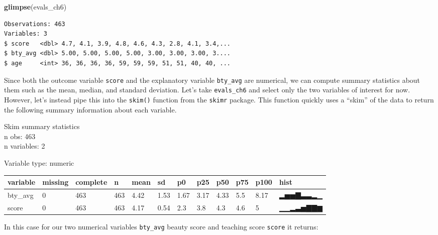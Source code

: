 \documentclass[12pt, krantz2,]{krantz}
\makeatletter
\newenvironment{Shaded}{\begin{snugshade}}{\end{snugshade}}
\newcommand{\KeywordTok}[1]{\textcolor[rgb]{0.27,0.27,0.27}{\textbf{#1}}}
\newcommand{\NormalTok}[1]{#1}
\newcommand{\OperatorTok}[1]{\textcolor[rgb]{0.43,0.43,0.43}{\textbf{#1}}}
\newcommand{\StringTok}[1]{\textcolor[rgb]{0.5,0.5,0.5}{#1}}
\newenvironment{kframe}{%
\medskip{}
\setlength{\fboxsep}{.8em}
 \def\at@end@of@kframe{}%
 \ifinner\ifhmode%
  \def\at@end@of@kframe{\end{minipage}}%
  \begin{minipage}{\columnwidth}%
 \fi\fi%
 \def\FrameCommand##1{\hskip\@totalleftmargin \hskip-\fboxsep
 \colorbox{shadecolor}{##1}\hskip-\fboxsep
     \hskip-\linewidth \hskip-\@totalleftmargin \hskip\columnwidth}%
 \MakeFramed {\advance\hsize-\width
   \@totalleftmargin\z@ \linewidth\hsize
   \@setminipage}}%
 {\par\unskip\endMakeFramed%
 \at@end@of@kframe}
\renewenvironment{Shaded}{\begin{kframe}}{\end{kframe}}
\makeatother
\begin{document}
\begin{Shaded}
\begin{Highlighting}[]
\KeywordTok{glimpse}\NormalTok{(evals_ch6)}
\end{Highlighting}
\end{Shaded}

\begin{verbatim}
Observations: 463
Variables: 3
$ score   <dbl> 4.7, 4.1, 3.9, 4.8, 4.6, 4.3, 2.8, 4.1, 3.4,...
$ bty_avg <dbl> 5.00, 5.00, 5.00, 5.00, 3.00, 3.00, 3.00, 3....
$ age     <int> 36, 36, 36, 36, 59, 59, 59, 51, 51, 40, 40, ...
\end{verbatim}

Since both the outcome variable \texttt{score} and the explanatory variable \texttt{bty\_avg} are numerical, we can compute summary statistics about them such as the mean, median, and standard deviation. Let's take \texttt{evals\_ch6} and select only the two variables of interest for now. However, let's instead pipe this into the \texttt{skim()} function from the \texttt{skimr} package. This function quickly uses a ``skim'' of the data to return the following summary information about each variable.

\begin{Shaded}
\end{Shaded}

Skim summary statistics\\
n obs: 463\\
n variables: 2

Variable type: numeric

\begin{tabular}{l|l|l|l|l|l|l|l|l|l|l|l}
\hline
variable & missing & complete & n & mean & sd & p0 & p25 & p50 & p75 & p100 & hist\\
\hline
bty\_avg & 0 & 463 & 463 & 4.42 & 1.53 & 1.67 & 3.17 & 4.33 & 5.5 & 8.17 & ▂▅▅▇▃▃▂▁\\
\hline
score & 0 & 463 & 463 & 4.17 & 0.54 & 2.3 & 3.8 & 4.3 & 4.6 & 5 & ▁▁▂▃▅▇▇▆\\
\hline
\end{tabular}

In this case for our two numerical variables \texttt{bty\_avg} beauty score and teaching score \texttt{score} it returns:
\end{document}
